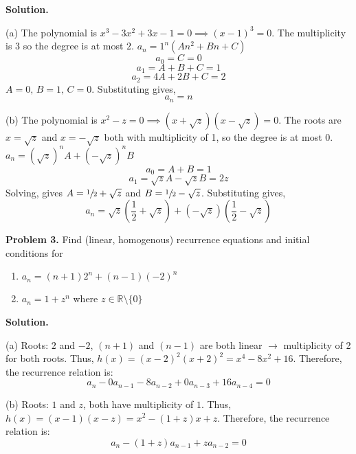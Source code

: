 \textbf{Solution.}

(a) The polynomial is $ x^3-3x^2+3x-1=0\implies (x-1)^3=0 $. The multiplicity
is $ 3 $ so the degree is at most $ 2 $.
$ a_n=1^n(An^2+Bn+C) $
\[ a_0=C=0 \]
\[ a_1=A+B+C=1 \]
\[ a_2=4A+2B+C=2 \]
$ A=0,\, B=1,\, C=0 $. Substituting gives,
\[ a_n=n \]

(b) The polynomial is $ x^2-z=0\implies (x+\sqrt{z})(x-\sqrt{z})=0 $.
The roots are $ x=\sqrt{z} $ and $ x=-\sqrt{z} $ both with multiplicity of 1,
so the degree is at most $ 0 $.
$ a_n=(\sqrt{z})^n A + (-\sqrt{z})^n B $
\[ a_0=A+B=1\]
\[ a_1=\sqrt{z}A -\sqrt{z}B=2z \]
Solving, gives $ A=\sfrac{1}{2} +\sqrt{z} $ and $ B=\sfrac{1}{2} -\sqrt{z} $.
Substituting gives,
\[ a_n=\sqrt{z}\left(\frac{1}{2} +\sqrt{z}\right)
    +(-\sqrt{z})\left(\frac{1}{2} -\sqrt{z}\right) \]


\textbf{Problem 3.} Find (linear, homogenous) recurrence equations and initial
conditions for
\begin{enumerate}[label=(\alph*)]
    \item $ a_n=(n+1)2^n+(n-1)(-2)^n $
    \item $ a_n=1+z^n $ where $ z\in\mathbb{R}\setminus \{0\} $
\end{enumerate}

\textbf{Solution.}

(a) Roots: $ 2 $ and $ -2 $, $ (n+1) $ and $ (n-1) $ are both linear
$ \rightarrow $ multiplicity of 2 for both
roots. Thus, $ h(x)=(x-2)^2(x+2)^2=x^4-8x^2+16 $. Therefore, the recurrence
relation is:
\[ a_n-0 a_{n-1}-8a_{n-2}+0 a_{n-3}+16a_{n-4}=0 \]

(b) Roots: $ 1 $ and $ z $, both have multiplicity of $ 1 $. Thus,
$ h(x)=(x-1)(x-z)=x^2-(1+z)x+z $. Therefore, the recurrence relation is:
\[ a_n-(1+z)a_{n-1}+z a_{n-2}=0 \]

